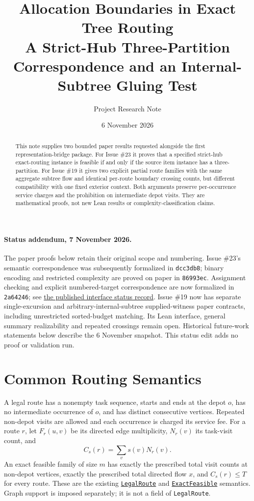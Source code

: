 \documentclass[11pt]{article}
\title{Allocation Boundaries in Exact Tree Routing\\
  \large A Strict-Hub Three-Partition Correspondence and an Internal-Subtree Gluing Test}
\author{Project Research Note}
\date{6 November 2026}
\theoremstyle{remark}
\newcommand{\code}[1]{\nolinkurl{#1}}
\newcommand{\src}[2]{\href{https://github.com/huam54925-cpu/uav-routing-certification/blob/1bc992475a9bd515d77245e2bc0471e5ecab2fd5/LeanCompletion/UAV/#1.lean}{#2}}
\begin{document}
\maketitle

\begin{abstract}
This note supplies two bounded paper results requested alongside the first representation-bridge package.
For Issue \#23 it proves that a specified strict-hub exact-routing instance is feasible if and only if the source item instance has a three-partition.
For Issue \#19 it gives two explicit partial route families with the same aggregate subtree flow and identical per-route boundary crossing counts, but different compatibility with one fixed exterior context.
Both arguments preserve per-occurrence service charges and the prohibition on intermediate depot visits.
They are mathematical proofs, not new Lean results or complexity-classification claims.
\end{abstract}

\paragraph{Status addendum, 7 November 2026.}
The paper proofs below retain their original scope and numbering.
Issue \#23's semantic correspondence was subsequently formalized in
\code{dcc3db8}; binary encoding and restricted complexity are proved on
paper in \code{86993ec}. Assignment checking and explicit numbered-target
correspondence are now formalized in \code{2a64246}; see
\href{https://github.com/huam54925-cpu/uav-routing-certification/blob/2a64246acd8e5fe323e8d6bbe3fd3399cdedd3df/docs/HUB_INTERFACES_STATUS.md}{the published interface status record}.
Issue \#19 now has separate single-excursion and arbitrary-internal-subtree
supplied-witness paper contracts, including unrestricted sorted-budget
matching. Its Lean interface, general summary realizability and repeated
crossings remain open. Historical future-work statements below describe
the 6 November snapshot. This status edit adds no proof or validation run.

\section{Common Routing Semantics}

A legal route has a nonempty task sequence, starts and ends at the depot $o$, has no intermediate occurrence of $o$, and has distinct consecutive vertices.
Repeated non-depot visits are allowed and each occurrence is charged its service fee.
For a route $r$, let $F_r(u,v)$ be its directed edge multiplicity, $N_r(v)$ its task-visit count, and
\[
 C_s(r)=\sum_v s(v)N_r(v).
\]
An exact feasible family of size $m$ has exactly the prescribed total visit counts at non-depot vertices, exactly the prescribed total directed flow $x$, and $C_s(r)\leq T$ for every route.
These are the existing \src{RouteToFlow}{\code{LegalRoute}} and
\src{SupportExactFeasibility}{\code{ExactFeasible}} semantics.
Graph support is imposed separately; it is not a field of \code{LegalRoute}.
\end{document}
